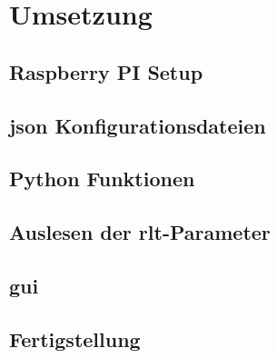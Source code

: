 \chapter{Umsetzung}

\newpage
\section{Raspberry PI Setup}
\setAuthor{\pezze}


\newpage
\setAuthor{\mangeng}


\newpage
\section{\acs{json} Konfigurationsdateien}
\setAuthor{\pezze}



\newpage
\setAuthor{\schneider}


\newpage
\section{Python Funktionen}
\setAuthor{\pezze}


\newpage
\section{Auslesen der \acs{rlt}-Parameter}
\setAuthor{\schneider}


\newpage
\section{\acf{gui}}
\setAuthor{\pezze}



\newpage
\section{Fertigstellung}
\setAuthor{\schneider}


\newpage
\setAuthor{\pezze}



